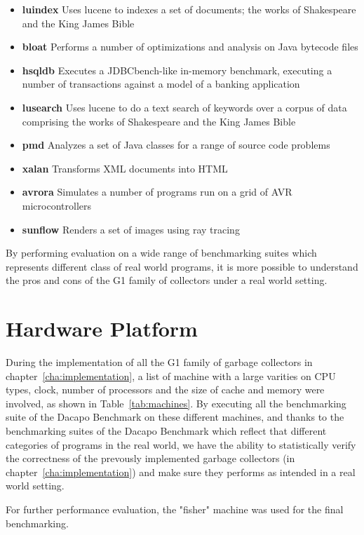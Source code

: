 \begin{itemize}
  \item \textbf{luindex} Uses lucene to indexes a set of documents; the works of Shakespeare and the King James Bible
  \item \textbf{bloat} Performs a number of optimizations and analysis on Java bytecode files
  \item \textbf{hsqldb} Executes a JDBCbench-like in-memory benchmark, executing a number of transactions against a model of a banking application
  \item \textbf{lusearch} Uses lucene to do a text search of keywords over a corpus of data comprising the works of Shakespeare and the King James Bible
  \item \textbf{pmd} Analyzes a set of Java classes for a range of source code problems
  \item \textbf{xalan} Transforms XML documents into HTML
  \item \textbf{avrora} Simulates a number of programs run on a grid of AVR microcontrollers
  \item \textbf{sunflow} Renders a set of images using ray tracing
\end{itemize}

By performing evaluation on a wide range of benchmarking suites which represents different
class of real world programs, it is more possible to understand the pros and cons
of the G1 family of collectors under a real world setting.

\section{Hardware Platform} %
\label{sec:hardware}

During the implementation of all the G1 family of garbage collectors in chapter~\ref{cha:implementation},
a list of machine with a large varities on CPU types, clock, number of processors and
the size of cache and memory were involved, as shown in Table~\ref{tab:machines}.
By executing all the benchmarking suite of the Dacapo Benchmark on these different machines,
and thanks to the benchmarking suites of the Dacapo Benchmark which reflect
that different categories of programs in the real world,
we have the ability to statistically verify the correctness of the prevously
implemented garbage collectors (in chapter~\ref{cha:implementation})
and make sure they performs as intended in a real world setting.

For further performance evaluation, the "fisher" machine was used for the final benchmarking.

